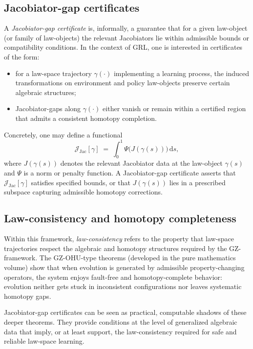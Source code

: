 \documentclass[11pt]{book}
\theoremstyle{plain}
\theoremstyle{definition}
\theoremstyle{remark}
\begin{document}
\subsection*{Jacobiator-gap certificates}

A \emph{Jacobiator-gap certificate} is, informally, a guarantee that
for a given law-object (or family of law-objects) the relevant
Jacobiators lie within admissible bounds or compatibility
conditions. In the context of GRL, one is interested in certificates
of the form:
\begin{itemize}
  \item for a law-space trajectory $\gamma(\cdot)$ implementing a
        learning process, the induced transformations on
        environment and policy law-objects preserve certain
        algebraic structures;
  \item Jacobiator-gaps along $\gamma(\cdot)$ either vanish or
        remain within a certified region that admits a consistent
        homotopy completion.
\end{itemize}

Concretely, one may define a functional
\[
   \mathcal{J}_{\mathrm{Jac}}[\gamma]
   \;=\;
   \int_0^1 \Psi\bigl(J(\gamma(s))\bigr)\,\mathrm{d}s,
\]
where $J(\gamma(s))$ denotes the relevant Jacobiator data at the
law-object $\gamma(s)$ and $\Psi$ is a norm or penalty function.
A Jacobiator-gap certificate asserts that
$\mathcal{J}_{\mathrm{Jac}}[\gamma]$ satisfies specified bounds, or
that $J(\gamma(s))$ lies in a prescribed subspace capturing
admissible homotopy corrections.

\subsection*{Law-consistency and homotopy completeness}

Within this framework, \emph{law-consistency} refers to the property
that law-space trajectories respect the algebraic and homotopy
structures required by the GZ-framework. The GZ-OHU-type theorems
(developed in the pure mathematics volume) show that when evolution
is generated by admissible property-changing operators, the system
enjoys fault-free and homotopy-complete behavior: evolution neither
gets stuck in inconsistent configurations nor leaves systematic
homotopy gaps.

Jacobiator-gap certificates can be seen as practical, computable
shadows of these deeper theorems. They provide conditions at the
level of generalized algebraic data that imply, or at least support,
the law-consistency required for safe and reliable law-space
learning.
\end{document}

